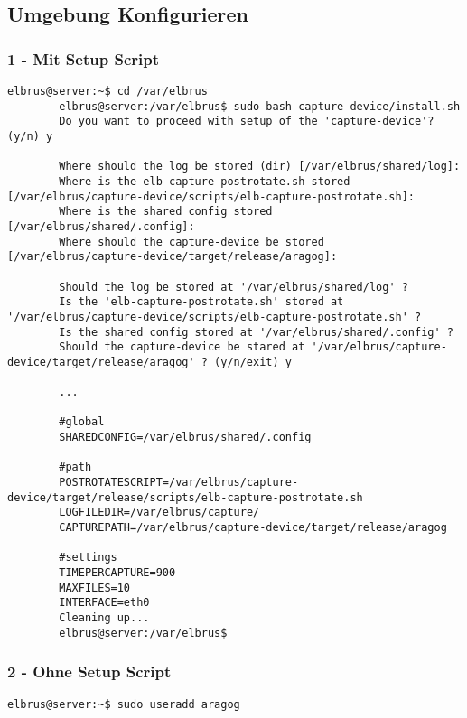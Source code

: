 	
	\subsection[file config]{Umgebung Konfigurieren}
	\subsubsection{1 - Mit Setup Script}
	
	\lstset{style=commands}
	\begin{lstlisting}[caption={Ausführen des 'install.sh' Scripts.}, breaklines=true,]
		elbrus@server:~$ cd /var/elbrus
		elbrus@server:/var/elbrus$ sudo bash capture-device/install.sh
		Do you want to proceed with setup of the 'capture-device'? (y/n) y
		
		Where should the log be stored (dir) [/var/elbrus/shared/log]:
		Where is the elb-capture-postrotate.sh stored [/var/elbrus/capture-device/scripts/elb-capture-postrotate.sh]:
		Where is the shared config stored [/var/elbrus/shared/.config]:
		Where should the capture-device be stored [/var/elbrus/capture-device/target/release/aragog]:
		
		Should the log be stored at '/var/elbrus/shared/log' ?
		Is the 'elb-capture-postrotate.sh' stored at '/var/elbrus/capture-device/scripts/elb-capture-postrotate.sh' ?
		Is the shared config stored at '/var/elbrus/shared/.config' ?
		Should the capture-device be stared at '/var/elbrus/capture-device/target/release/aragog' ? (y/n/exit) y
		
		...
		
		#global
		SHAREDCONFIG=/var/elbrus/shared/.config
		
		#path
		POSTROTATESCRIPT=/var/elbrus/capture-device/target/release/scripts/elb-capture-postrotate.sh
		LOGFILEDIR=/var/elbrus/capture/
		CAPTUREPATH=/var/elbrus/capture-device/target/release/aragog
		
		#settings
		TIMEPERCAPTURE=900
		MAXFILES=10
		INTERFACE=eth0
		Cleaning up...
		elbrus@server:/var/elbrus$
	\end{lstlisting}
	\newpage
	
	\subsubsection{2 - Ohne Setup Script}
	
	\lstset{style=commands}
	\begin{lstlisting}[caption={Anlegen eines Users der Berechtigungen zum ausführen des 'capture-device' erhält.}]
		elbrus@server:~$ sudo useradd aragog
	\end{lstlisting}
	
